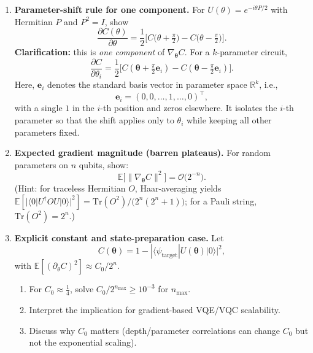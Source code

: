 \documentclass[11pt]{article}
\begin{document}
\begin{enumerate}[label=(\alph*)]
\item \textbf{Parameter-shift rule for one component.}
For $U(\theta)=e^{-i\theta P/2}$ with Hermitian $P$ and $P^2=I$, show
\[
\frac{\partial C(\theta)}{\partial\theta}
=\frac{1}{2}\Big[C\!\big(\theta+\tfrac{\pi}{2}\big)-C\!\big(\theta-\tfrac{\pi}{2}\big)\Big].
\]
\textbf{Clarification:} this is \emph{one component} of $\nabla_{\boldsymbol{\theta}} C$.
For a $k$-parameter circuit,
\[
\frac{\partial C}{\partial\theta_i}
=\frac{1}{2}\Big[C(\boldsymbol{\theta}+\tfrac{\pi}{2}\mathbf{e}_i)-C(\boldsymbol{\theta}-\tfrac{\pi}{2}\mathbf{e}_i)\Big].
\]
Here, \(\mathbf{e}_i\) denotes the standard basis vector in parameter space \(\mathbb{R}^k\), i.e.,
\[
\mathbf{e}_i = (0,0,\ldots,1,\ldots,0)^{\top},
\]
with a single \(1\) in the \(i\)-th position and zeros elsewhere. It isolates the \(i\)-th parameter so that the shift applies only to \(\theta_i\) while keeping all other parameters fixed.
\item \textbf{Expected gradient magnitude (barren plateaus).}
For random parameters on $n$ qubits, show:
\[
\mathbb{E}\big[\|\nabla_{\boldsymbol{\theta}}C\|^2\big]=\mathcal{O}\!\big(2^{-n}\big).
\]
(Hint: for traceless Hermitian $O$, Haar-averaging yields $\mathbb{E}[|\langle0|U^\dagger O U|0\rangle|^2]=\mathrm{Tr}(O^2)/\big(2^n(2^n+1)\big)$; for a Pauli string, $\mathrm{Tr}(O^2)=2^n$.)

\item \textbf{Explicit constant and state-preparation case.}
Let
\[
C(\boldsymbol{\theta})=1-|\langle\psi_{\mathrm{target}}|U(\boldsymbol{\theta})|0\rangle|^2,
\]
with $\mathbb{E}[(\partial_\theta C)^2]\approx C_0/2^n$. \newline

\begin{enumerate}[label=(\roman*)]
\item For $C_0\approx \tfrac{1}{4}$, solve $C_0/2^{n_{\max}}\ge 10^{-3}$ for $n_{\max}$.
\item Interpret the implication for gradient-based VQE/VQC scalability.
\item Discuss why $C_0$ matters (depth/parameter correlations can change $C_0$ but not the exponential scaling).
\end{enumerate}
\end{enumerate}
\end{document}
